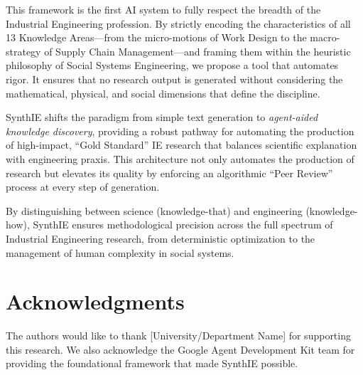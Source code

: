 \documentclass[12pt,a4paper]{article}
\begin{document}
This framework is the first AI system to fully respect the breadth of the Industrial Engineering profession. By strictly encoding the characteristics of all 13 Knowledge Areas—from the micro-motions of Work Design to the macro-strategy of Supply Chain Management—and framing them within the heuristic philosophy of Social Systems Engineering, we propose a tool that automates rigor. It ensures that no research output is generated without considering the mathematical, physical, and social dimensions that define the discipline.

SynthIE shifts the paradigm from simple text generation to \textit{agent-aided knowledge discovery}, providing a robust pathway for automating the production of high-impact, ``Gold Standard'' IE research that balances scientific explanation with engineering praxis. This architecture not only automates the production of research but elevates its quality by enforcing an algorithmic ``Peer Review'' process at every step of generation.

By distinguishing between science (knowledge-that) and engineering (knowledge-how), SynthIE ensures methodological precision across the full spectrum of Industrial Engineering research, from deterministic optimization to the management of human complexity in social systems.

\section*{Acknowledgments}

The authors would like to thank [University/Department Name] for supporting this research. We also acknowledge the Google Agent Development Kit team for providing the foundational framework that made SynthIE possible.
\end{document}
